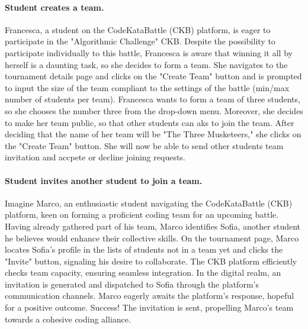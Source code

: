 \paragraph*{Student creates a team.}
Francesca, a student on the CodeKataBattle (CKB) platform, is eager to participate in the "Algorithmic Challenge" CKB.
Despite the possibility to participate individually to this battle, 
Francesca is aware that winning it all by herself is a daunting task, so she decides to form a team.
She navigates to the tournament details page and clicks on the "Create Team" button and is prompted to input the size of the team compliant to the settings of the battle (min/max number of students per team).
Francesca wants to form a team of three students, so she chooses the number three from the drop-down menu. Moreover, she decides to make her team public, so that other students can aks to join the team.
After deciding that the name of her team will be "The Three Musketeers," she clicks on the "Create Team" button.
She will now be able to send other students team invitation and accpete or decline joining requests.


\paragraph*{Student invites another student to join a team.}
Imagine Marco, an enthusiastic student navigating the CodeKataBattle (CKB) platform, keen on forming a proficient coding team for an upcoming battle. 
Having already gathered part of his team, Marco identifies Sofia, another student he believes would enhance their collective skills.
On the tournament page, Marco locates Sofia's profile in the lists of students not in a team yet and clicks the "Invite" button, signaling his desire to collaborate. 
The CKB platform efficiently checks team capacity, ensuring seamless integration.
In the digital realm, an invitation is generated and dispatched to Sofia through the platform's communication channels. 
Marco eagerly awaits the platform's response, hopeful for a positive outcome.
Success! The invitation is sent, propelling Marco's team towards a cohesive coding alliance.




